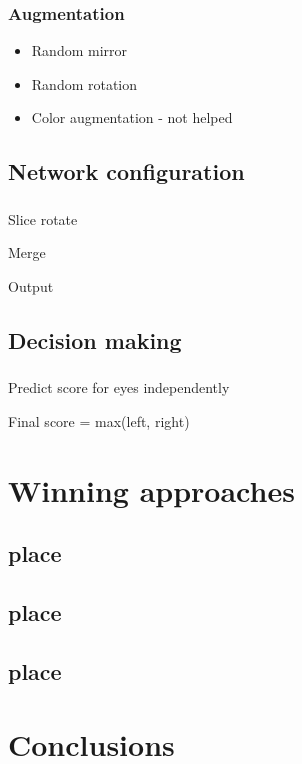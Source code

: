 \documentclass{beamer}
\begin{document}
\begin{frame}\frametitle{Augmentation}
\begin{itemize}
\item Random mirror
\item Random rotation
\item Color augmentation - not helped
\end{itemize}

\end{frame}

\subsection{Network configuration}
\begin{frame}\frametitle{}
\par Slice rotate
\par Merge
\par Output
\end{frame}

\subsection{Decision making}

\begin{frame}\frametitle{}
\par Predict score for eyes independently
\par Final score = max(left, right)
\end{frame}

\section{Winning approaches} 
\subsection{ place}
\subsection{ place}
\subsection{ place}

\section{Conclusions}
\end{document}
